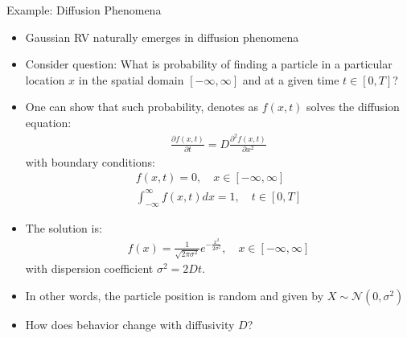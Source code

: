 \documentclass[handout,9pt]{beamer}
\begin{document}
%
\begin{frame}{Example: Diffusion Phenomena}
\begin{itemize}
\setlength{\itemsep}{5pt}
\item Gaussian RV naturally emerges in diffusion phenomena
\item Consider question: What is probability of finding a particle in a particular location $x$ in the spatial domain $ [-\infty,\infty]$ and at a given time $t\in [0,T]$?
\item One can show that such probability, denotes as $f(x,t)$ solves the diffusion equation:
\begin{align*}
\frac{\partial f(x,t)}{\partial t}=D\frac{\partial^2 f(x,t)}{\partial x^2}
\end{align*}
with boundary conditions:
\begin{align*}
f(x,t)=0,\quad x\in [-\infty,\infty]\\
\int_{-\infty}^{\infty}f(x,t)dx=1,\quad t\in [0,T]
\end{align*}
\item The solution is:
\begin{align*}
f(x)=\frac{1}{\sqrt{2 \pi \sigma^2}}e^{-\frac{x^2}{2\sigma^2}},\quad  x\in [-\infty,\infty]
\end{align*}
with dispersion coefficient $\sigma^2=2Dt$.
\item In other words, the particle position is random and given by $X\sim\mathcal{N}(0,\sigma^2)$ 
\item How does behavior change with diffusivity $D$?
\end{itemize}

\end{frame}
\end{document}
